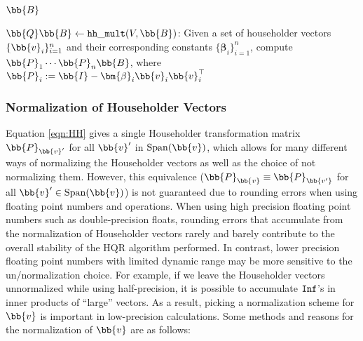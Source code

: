 	\begin{algorithm2e}
		\DontPrintSemicolon %
		
		\Return $\bb{B}$
		\caption{$\bb{Q}\bb{B}\gets {\tt hh\_mult}(V, \bb{B})$: Given a set of householder vectors $\{\bb{v}_i\}_{i=1}^n$ and their corresponding constants $\{\bm{\beta}_i\}_{i=1}^n$, compute $\bb{P}_1\cdots \bb{P}_n\bb{B}$, where $\bb{P}_i := \bb{I} - \bm{\beta}_i\bb{v}_i\bb{v}_i^{\top}$}
		\label{algo:hh_mult}
	\end{algorithm2e}

		
\subsubsection{Normalization of Householder Vectors}
\label{sssec:NormalizeHV}
Equation \ref{eqn:HH} gives a single Householder transformation matrix $\bb{P}_{\bb{v}'}$ for all $\bb{v}'$ in $\mathrm{Span}(\bb{v})$, which allows for many different ways of normalizing the Householder vectors as well as the choice of not normalizing them.
However, this equivalence ($\bb{P}_{\bb{v}}\equiv \bb{P}_{\bb{v'}}$ for all $\bb{v}' \in \mathrm{Span}(\bb{v})$)  is not guaranteed due to rounding errors when using floating point numbers and operations.
When using high precision floating point numbers such as double-precision floats, rounding errors that accumulate from the normalization of Householder vectors rarely and barely contribute to the overall stability of the HQR algorithm performed.
In contrast, lower precision floating point numbers with limited dynamic range may be more sensitive to the un/normalization choice.
For example, if we leave the Householder vectors unnormalized while using half-precision, it is possible to accumulate $\tt{Inf}$'s in inner products of ``large'' vectors.
As a result,  picking a normalization scheme for $\bb{v}$ is important in low-precision calculations.
Some methods and reasons for the normalization of $\bb{v}$ are as follows:

